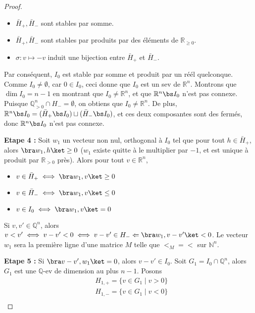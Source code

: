\begin{proof}
\begin{itemize}
                \item $\bar H_+, \bar H_-$ sont stables par somme.
                \item $\bar H_+, \bar H_-$ sont stables par produits par des éléments de $\mathbb{R}_{\geq 0}$.
                \item $\sigma : v \mapsto -v$ induit une bijection entre $\bar H_+$ et $\bar H_-$.
            \end{itemize}
            Par conséquent, $I_0$ est stable par somme et produit par un réél quelconque. Comme $I_0 \neq \emptyset$, car $0 \in I_0$, ceci donne que $I_0$ est un sev de $\mathbb{R}^n$. Montrons que $\dim I_0 = n - 1$ en montrant que $I_0 \neq \mathbb{R}^n$, et que $\mathbb{R}^n \bs I_0$ n'est pas connexe. Puisque $\mathbb{Q}_{> 0}^n \cap H_- = \emptyset$, on obtiens que $I_0 \neq \mathbb{R}^n$. De plus, $\mathbb{R}^n \bs I_0 = (\bar H_+ \bs I_0) \sqcup (\bar H_- \bs I_0)$, et ces deux composantes sont des fermés, donc $\mathbb{R}^n \bs I_0$ n'est pas connexe.
            \item \textbf{Etape 4 :} Soit $w_1$ un vecteur non nul, orthogonal à $I_0$ tel que pour tout $h \in \bar H_+$, alors $\bra w_1,h \ket\geq 0$ ($w_1$ existe quitte à le multiplier par $-1$, et est unique à produit par $\mathbb{R}_{>0}$ près). Alors pour tout $v \in \mathbb{R}^n$,
            \begin{itemize}
                \item $v \in \bar H_+ \iff \bra w_1, v \ket \geq 0$
                \item $v \in \bar H_- \iff \bra w_1, v \ket \leq 0$
                \item $v \in I_0 \iff \bra w_1, v \ket = 0$
            \end{itemize}
            Si $v,v' \in \mathbb{Q}^n$, alors $v < v' \iff v - v' < 0 \iff v - v' \in H_- \Leftarrow \bra w_1, v - v' \ket < 0$. Le vecteur $w_1$ sera la première ligne d'une matrice $M$ telle que $<_M = <$ sur $\mathbb{N}^n$.
            \item \textbf{Etape 5 :} Si $\bra v - v', w_1 \ket = 0$, alors $v - v' \in I_0$. Soit $G_1 = I_0 \cap \mathbb{Q}^n$, alors $G_1$ est une $\mathbb{Q}$-ev de dimension au plus $n-1$. Posons 
            \begin{align*}
                &H_{1,+} = \{v \in G_1 \mid v > 0 \} \\
                &H_{1,-} = \{v \in G_1 \mid v < 0 \} \\
            \end{align*}

\end{proof}
